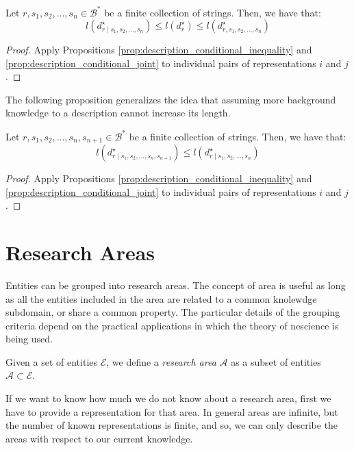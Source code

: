 \begin{proposition}
Let $r, s_1, s_2, \ldots, s_n \in \mathcal{B}^\ast$ be a finite collection of strings. Then, we have that:
\[
l \left( d^\star_{r \mid s_1, s_2, \ldots, s_n} \right) \leq l \left( d^\star_r \right) \leq l \left( d^\star_{r,s_1, s_2, \ldots, s_n} \right)
\]
\end{proposition}
\begin{proof}
Apply Propositions \ref{prop:description_conditional_inequality} and \ref{prop:description_conditional_joint} to individual pairs of representations $i$ and $j$.
\end{proof}

The following proposition generalizes the idea that assuming more background knowledge to a description cannot increase its length.

\begin{proposition}
Let $r, s_1, s_2, \ldots, s_n, s_{n+1} \in \mathcal{B}^\ast$ be a finite collection of strings. Then, we have that:
\[
l \left( d^\star_{r \mid s_1, s_2, \ldots, s_n, s_{n+1}} \right) \leq l \left( d^\star_{r \mid s_1, s_2, \ldots, s_n} \right)
\]
\end{proposition}
\begin{proof}
Apply Propositions \ref{prop:description_conditional_inequality} and \ref{prop:description_conditional_joint} to individual pairs of representations $i$ and $j$.
\end{proof}

%
%

\section{Research Areas}
\label{sec:areas}

Entities can be grouped into research areas. The concept of area is useful as long as all the entities included in the area are related to a common knolewdge subdomain, or share a common property. The particular details of the grouping criteria depend on the practical applications in which the theory of nescience is being used.

\begin{definition}
Given a set of entities $\mathcal{E}$, we define a \emph{research area} $\mathcal{A}$ as a subset of entities $\mathcal{A} \subset \mathcal{E}$.
\end{definition}

If we want to know how much we do not know about a research area, first we have to provide a representation for that area. In general areas are infinite, but the number of known representations is finite, and so, we can only describe the areas with respect to our current knowledge.

